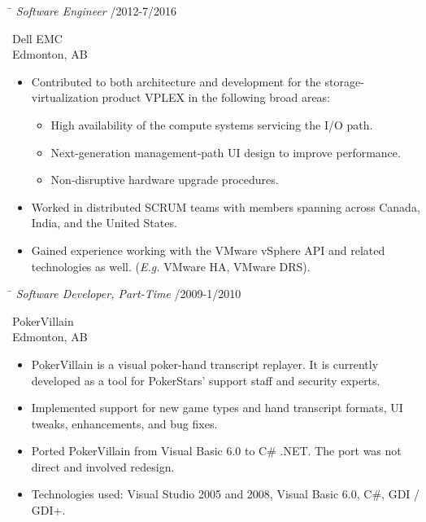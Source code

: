 \documentclass{res}
\begin{document}
\begin{resume}
    \vspace{-0.1in}
    \begin{tabbing}
    \hspace{5.15in}\= \kill  %
    \textit{Software Engineer} /2012-7/2016
    \end{tabbing}\vspace{-22pt}  %
    Dell EMC\\
    Edmonton, AB\\
    \vspace{-2.5ex}\begin{itemize}[noitemsep]
    \item Contributed to both architecture and development for the storage-virtualization product VPLEX in the following broad areas:
    \begin{itemize}[noitemsep]
    \item High availability of the compute systems servicing the I/O path.
    \item Next-generation management-path UI design to improve performance.
    \item Non-disruptive hardware upgrade procedures.
    \end{itemize}
    \item Worked in distributed SCRUM teams with members spanning across Canada, India, and the United States.
    \item Gained experience working with the VMware vSphere API and related technologies as well.  (\textit{E.g.} VMware HA, VMware DRS).
    \end{itemize}

    \vspace{-0.1in}
    \begin{tabbing}
    \hspace{5.15in}\= \kill  %
    \textit{Software Developer, Part-Time} /2009-1/2010
    \end{tabbing}\vspace{-22pt}  %
    PokerVillain\\
    Edmonton, AB\\
    \vspace{-2.5ex}\begin{itemize}[noitemsep]
    \item PokerVillain is a visual poker-hand transcript replayer.  It is currently developed as a tool for PokerStars' support staff and security experts.
    \item Implemented support for new game types and hand transcript formats, UI tweaks, enhancements, and bug fixes.
    \item Ported PokerVillain from Visual Basic 6.0 to C\# .NET.  The port was not direct and involved redesign.
    \item Technologies used: Visual Studio 2005 and 2008, Visual Basic 6.0, C\#, GDI / GDI+.
    \end{itemize}


\end{resume}
\end{document}
